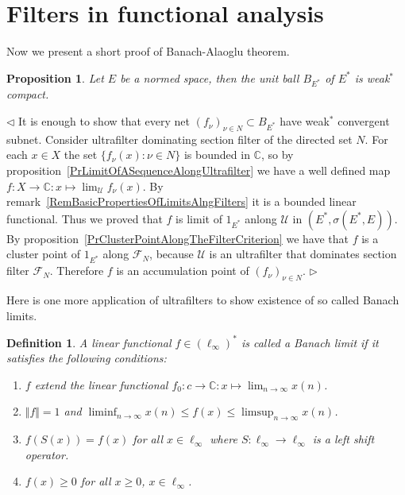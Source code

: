 \documentclass[12pt]{article}
\newtheorem{proposition}[theorem]{Proposition}
\newtheorem{definition}[theorem]{Definition}
\newenvironment{proof}{\par $\triangleleft$}{$\triangleright$}
\begin{document}
\section{Filters in functional analysis}

Now we present a short proof of Banach-Alaoglu theorem.

\begin{proposition}\label{PrBanachAlaoglu} Let $E$ be a normed space, then the
    unit ball $B_{E^*}$ of $E^*$ is weak${}^*$ compact.
\end{proposition}
\begin{proof} It is enough to show that every net ${(f_\nu)}_{\nu\in N}\subset
        B_{E^*}$ have weak${}^*$ convergent subnet. Consider ultrafilter
    dominating section filter of the directed set $N$. For each $x\in X$ the
    set $\{f_\nu(x):\nu\in N\}$ is bounded in $\mathbb{C}$, so by
    proposition~\ref{PrLimitOfASequenceAlongUltrafilter} we have a well
    defined map $f:X\to\mathbb{C}: x\mapsto\lim_{\mathcal{U}}f_\nu(x)$. By
    remark~\ref{RemBasicPropertiesOfLimitsAlngFilters} it is a bounded
    linear functional. Thus we proved that $f$ is limit of $1_{E^*}$ anlong
    $\mathcal{U}$ in $(E^*,\sigma(E^*, E))$. By
    proposition~\ref{PrClusterPointAlongTheFilterCriterion} we have that $f$
    is a cluster point of $1_{E^*}$ along $\mathcal{F}_N$, because
    $\mathcal{U}$ is an ultrafilter that dominates section filter
    $\mathcal{F}_N$. Therefore $f$ is an accumulation point of
    ${(f_\nu)}_{\nu\in N}$.
\end{proof}

Here is one more application of ultrafilters to show existence of so called
Banach limits.

\begin{definition}\label{DefBanachLimit} A linear functional
    $f\in{({\ell}_\infty)}^*$ is called a Banach limit if it satisfies the
    following conditions:
    \begin{enumerate}[label = (\roman*)]
        \item $f$ extend the linear functional $f_0:c\to\mathbb{C}:x\mapsto
                  \lim_{n\to\infty} x(n)$.
        \item $\Vert f\Vert=1$ and $\liminf_{n\to\infty}x(n)\leq f(x)\leq
                  \limsup_{n\to\infty} x(n)$.
        \item $f(S(x))=f(x)$ for all $x\in\ell_\infty$ where
              $S:\ell_\infty\to\ell_\infty$ is a left shift operator.
        \item $f(x)\geq 0$ for all $x\geq 0$, $x\in\ell_\infty$.
    \end{enumerate}
\end{definition}
\end{document}
